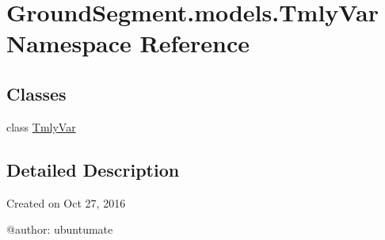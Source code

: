 \hypertarget{namespace_ground_segment_1_1models_1_1_tmly_var}{}\section{Ground\+Segment.\+models.\+Tmly\+Var Namespace Reference}
\label{namespace_ground_segment_1_1models_1_1_tmly_var}
\subsection*{Classes}
\begin{DoxyCompactItemize}
\item 
class \hyperlink{class_ground_segment_1_1models_1_1_tmly_var_1_1_tmly_var}{Tmly\+Var}
\end{DoxyCompactItemize}


\subsection{Detailed Description}
\begin{DoxyVerb}Created on Oct 27, 2016

@author: ubuntumate
\end{DoxyVerb}
 